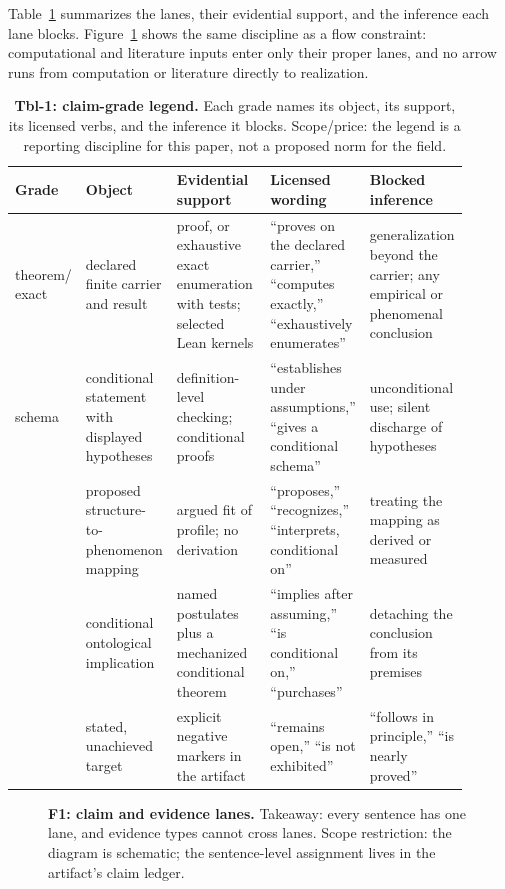 Table~\ref{tbl:grades} summarizes the lanes, their evidential support, and the
inference each lane blocks. Figure~\ref{fig:lanes} shows the same discipline as
a flow constraint: computational and literature inputs enter only their proper
lanes, and no arrow runs from computation or literature directly to
realization.

\begin{table}[t]
\centering\small
\begin{tabular}{p{0.1\linewidth}p{0.2\linewidth}p{0.22\linewidth}p{0.18\linewidth}p{0.2\linewidth}}
\toprule
Grade & Object & Evidential support & Licensed wording & Blocked inference \\
\midrule
\gradeS{} theorem/ exact & declared finite carrier and result & proof, or exhaustive exact enumeration with tests; selected Lean kernels & ``proves on the declared carrier,'' ``computes exactly,'' ``exhaustively enumerates'' & generalization beyond the carrier; any empirical or phenomenal conclusion \\
\gradeS{} schema & conditional statement with displayed hypotheses & definition-level checking; conditional proofs & ``establishes under assumptions,'' ``gives a conditional schema'' & unconditional use; silent discharge of hypotheses \\
\gradeR{} & proposed structure-to-phenomenon mapping & argued fit of profile; no derivation & ``proposes,'' ``recognizes,'' ``interprets, conditional on'' & treating the mapping as derived or measured \\
\gradeO{} & conditional ontological implication & named postulates plus a mechanized conditional theorem & ``implies after assuming,'' ``is conditional on,'' ``purchases'' & detaching the conclusion from its premises \\
\gradeOpen{} & stated, unachieved target & explicit negative markers in the artifact & ``remains open,'' ``is not exhibited'' & ``follows in principle,'' ``is nearly proved'' \\
\bottomrule
\end{tabular}
\caption{\textbf{Tbl-1: claim-grade legend.} Each grade names its object, its
support, its licensed verbs, and the inference it blocks. Scope/price: the
legend is a reporting discipline for this paper, not a proposed norm for the
field.}
\label{tbl:grades}
\end{table}

\begin{figure}[t]
\centering
{}
\caption{\textbf{F1: claim and evidence lanes.} Takeaway: every sentence has
one lane, and evidence types cannot cross lanes. Scope restriction: the
diagram is schematic; the sentence-level assignment lives in the artifact's
claim ledger.}
\label{fig:lanes}
\end{figure}

